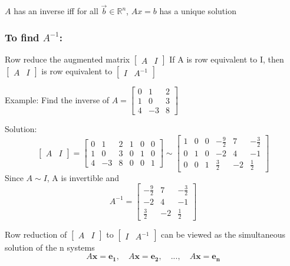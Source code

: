 \documentclass[12pt]{article} %
\newcommand{\R}{\mathbb{R}}
\begin{document}
$A$ has an inverse iff for all $\vec{b} \in \R^n$, $Ax=b$ has a unique solution

\subsubsection{To find $A^{-1}$:}
Row reduce the augmented matrix $\begin{bmatrix}
	A & I
\end{bmatrix}$ If A is row equivalent to I, then $\begin{bmatrix}
	A & I
\end{bmatrix}$ is row equivalent to $\begin{bmatrix}
	I & A^{-1}
\end{bmatrix}$

Example: 
Find the inverse of $A = \begin{bmatrix}
	0 & 1 & 2\\
	1 & 0 & 3\\
	4 & -3 & 8
\end{bmatrix}$

Solution:
$$\begin{bmatrix}
	A & I
\end{bmatrix} = \begin{bmatrix}
	0 & 1 & 2 & 1 & 0 & 0\\
	1 & 0 & 3 & 0 & 1 & 0\\
	4 & -3 & 8 & 0 & 0 & 1
\end{bmatrix} \sim \begin{bmatrix}
	1 & 0 & 0 & -\frac{9}{2} & 7 & -\frac{3}{2}\\
	0 & 1 & 0 & -2 & 4 & -1\\
	0 & 0 & 1 & \frac{3}{2} & -2 & \frac{1}{2}
\end{bmatrix}$$
Since $A \sim I$, A is invertible and 
$$A^{-1} = \begin{bmatrix}
	-\frac{9}{2} & 7 & -\frac{3}{2}\\
	-2 & 4 & -1\\
	\frac{3}{2} & -2 & \frac{1}{2}
\end{bmatrix}$$

Row reduction of $\begin{bmatrix}
	A & I
\end{bmatrix}$ to $\begin{bmatrix}
	I & A^{-1}
\end{bmatrix}$ can be viewed as the simultaneous solution of the n systems 
$$A\mathbf{x} = \mathbf{e_1}, \quad A\mathbf{x} = \mathbf{e_2}, \quad ..., \quad A\mathbf{x} = \mathbf{e_n}$$
\end{document}
